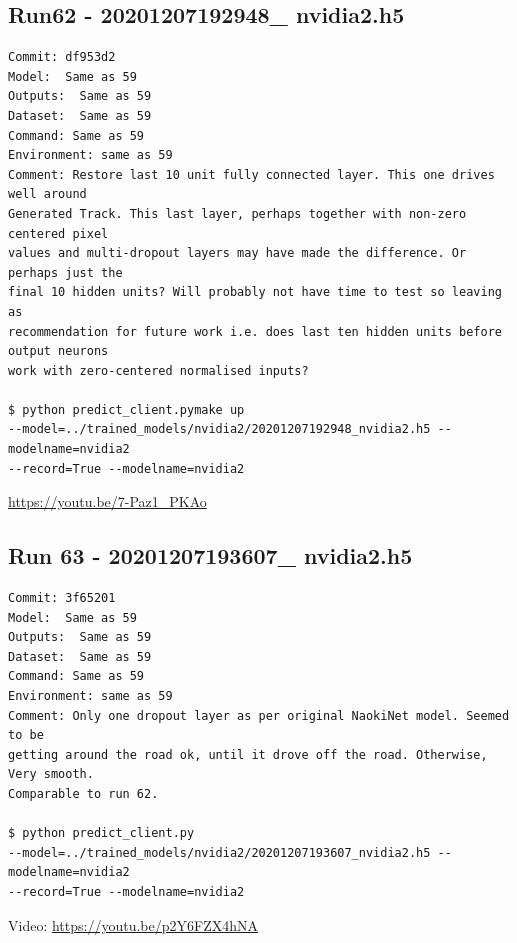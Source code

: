 \subsection{Run62 - 20201207192948\_ nvidia2.h5}
\label{app_res:62}
\begin{verbatim}
Commit: df953d2
Model:  Same as 59
Outputs:  Same as 59
Dataset:  Same as 59
Command: Same as 59
Environment: same as 59
Comment: Restore last 10 unit fully connected layer. This one drives well around 
Generated Track. This last layer, perhaps together with non-zero centered pixel 
values and multi-dropout layers may have made the difference. Or perhaps just the 
final 10 hidden units? Will probably not have time to test so leaving as 
recommendation for future work i.e. does last ten hidden units before output neurons 
work with zero-centered normalised inputs?

$ python predict_client.pymake up 
--model=../trained_models/nvidia2/20201207192948_nvidia2.h5 --modelname=nvidia2 
--record=True --modelname=nvidia2
\end{verbatim}
\url{https://youtu.be/7-Paz1_PKAo}

\subsection{Run 63 - 20201207193607\_ nvidia2.h5}
\begin{verbatim}
Commit: 3f65201
Model:  Same as 59
Outputs:  Same as 59
Dataset:  Same as 59
Command: Same as 59
Environment: same as 59 
Comment: Only one dropout layer as per original NaokiNet model. Seemed to be
getting around the road ok, until it drove off the road. Otherwise, Very smooth.
Comparable to run 62.

$ python predict_client.py 
--model=../trained_models/nvidia2/20201207193607_nvidia2.h5 --modelname=nvidia2 
--record=True --modelname=nvidia2

\end{verbatim}
Video: \url{https://youtu.be/p2Y6FZX4hNA}

